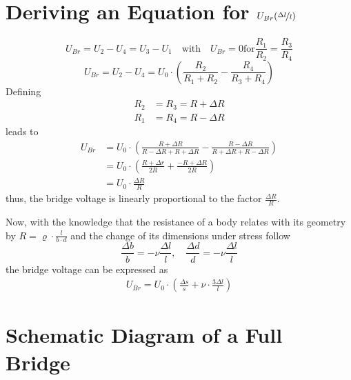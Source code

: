         \section{Deriving an Equation for \( U_{Br}(\nicefrac[]{\Delta l}{l}) \)}\label{sec:A4 equation for full bridge circuit}%
        \begin{equation}
            U_{Br} = U_2 - U_4 = U_3 - U_1 \quad \text{with} \quad U_{Br} = 0 \text{for} \frac{R_1}{R_2} = \frac{R_3}{R_4}
        \end{equation}
        \begin{equation}
            U_{Br} = U_2 - U_4 = U_0 \cdot \left(\frac{R_2}{R_1 + R_2} - \frac{R_4}{R_3 + R_4}\right)
        \end{equation}
        Defining
        \begin{align}
            R_2 &= R_3 = R + \Delta R \\
            R_1 &= R_4 = R - \Delta R
        \end{align}
        leads to
        \begin{align}
            U_{Br}  &= U_0 \cdot \left(\frac{R + \Delta R}{R - \Delta R + R + \Delta R} - \frac{R - \Delta R}{R + \Delta R + R - \Delta R}\right) \nonumber \\
                    &= U_0 \cdot \left(\frac{R+\Delta r}{2R} + \frac{-R + \Delta R}{2R}\right) \nonumber \\
                    &= U_0 \cdot \frac{\Delta R}{R}
            \label{eq:Ubr and delta R}
        \end{align}
        thus, the bridge voltage is linearly proportional to the factor \( \frac{\Delta R}{R} \).\par
        Now, with the knowledge that the resistance of a body relates with its geometry by \( R = \varrho \cdot \frac{l}{b \cdot d} \)
        and the change of its dimensions under stress follow
        \begin{equation}
            \frac{\Delta b}{b} = -\nu \frac{\Delta l}{l}, \quad \frac{\Delta d}{d} = -\nu \frac{\Delta l}{l}
        \end{equation}
        the bridge voltage can be expressed as
        \begin{align}
            U_{Br} = U_0 \cdot \left( \frac{\Delta s}{s} + \nu \cdot \frac{3 \Delta l}{l}\right)
        \end{align}
        \section{Schematic Diagram of a Full Bridge}\label{sec:A5 schematic diagram full bridge}%
